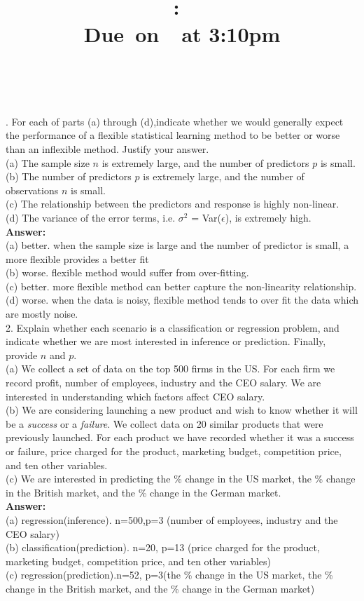 \documentclass[12pt]{article}
\title{
    \vspace{2in}
    \textmd{\textbf{\hmwkClass:\ \hmwkTitle}}\\
    \normalsize\vspace{0.1in}\small{Due\ on\ \hmwkDueDate\ at 3:10pm}\\
    \vspace{0.1in}\large{\textit{\hmwkClassInstructor\ \hmwkClassTime}}
    \vspace{3in}
}
\author{\textbf{\hmwkAuthorName}}
\date{}
\begin{document}
\maketitle

. For each of parts (a) through (d),indicate whether we would generally expect the performance of a flexible statistical learning method to be better or worse than an inflexible method. Justify your answer.\\
(a) The sample size $n$ is extremely large, and the number of predictors $p$ is small.\\
(b) The number of predictors $p$ is extremely large, and the number of observations $n$ is small.\\
(c) The relationship between the predictors and response is highly non-linear.\\
(d) The variance of the error terms, i.e. $\sigma^2$ = Var($\epsilon$), is extremely high.\\
\textbf{Answer:}\\
(a)  better. when the sample size is large and the number of predictor is small, a more flexible provides a better fit
\\
(b) worse. flexible method would suffer from over-fitting. \\
(c) better. more flexible method can better capture the non-linearity relationship.\\
(d) worse. when the data is noisy, flexible method tends to over fit the data which are mostly noise.\\

2. Explain whether each scenario is a classification or regression problem, and indicate whether we are most interested in inference or prediction. Finally, provide $n$ and $p$.\\
(a) We collect a set of data on the top 500 firms in the US. For each firm we record profit, number of employees, industry and the CEO salary. We are interested in understanding which factors affect CEO salary. \\
(b) We are considering launching a new product and wish to know whether it will be a \textit{success} or a \textit{failure}. We collect data on 20 similar products that were previously launched. For each product we have recorded whether it was a success or failure, price charged for the product, marketing budget, competition price, and ten other variables.\\
(c) We are interested in predicting the \% change in the US market, the \% change in the British market, and the \% change in the German market.\\
\textbf{Answer:}\\
(a) regression(inference). n=500,p=3 (number of employees, industry and the CEO salary)\\
(b) classification(prediction). n=20, p=13 (price charged for the product, marketing budget, competition price, and ten other variables)\\
(c) regression(prediction).n=52, p=3(the \% change in the US market, the \% change in the British market, and the \% change in the German market) \\
\end{document}
